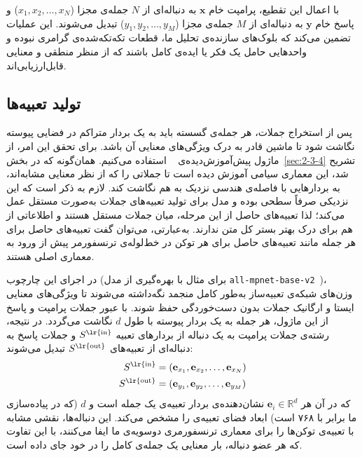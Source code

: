 با اعمال این تقطیع، پرامپت خام $\mathbf{x}$ به دنباله‌ای از $N$ جمله‌ی مجزا ($x_1, x_2, \dots, x_N$) و پاسخ خام $\mathbf{y}$ به دنباله‌ای از $M$ جمله‌ی مجزا ($y_1, y_2, \dots, y_M$) تبدیل می‌شوند. این عملیات تضمین می‌کند که بلوک‌های سازنده‌ی تحلیل ما، قطعات تکه‌تکه‌شده‌ی گرامری نبوده و واحدهایی حامل یک فکر یا ایده‌ی کامل باشند که از منظر منطقی و معنایی قابل‌ارزیابی‌اند.


\subsection{تولید تعبیه‌ها}\label{sec:4-2-2}

پس از استخراج جملات، هر جمله‌ی گسسته باید به یک بردار متراکم در فضایی پیوسته نگاشت شود تا ماشین قادر به درک ویژگی‌های معنایی آن باشد. برای تحقق این امر، از ماژول پیش‌آموزش‌دیده‌ی ~\cite{reimers2019sentencebert} استفاده می‌کنیم. همان‌گونه که در بخش~\ref{sec:2-3-4} تشریح شد، این معماری سیامی آموزش دیده است تا جملاتی را که از نظر معنایی مشابه‌اند، به بردارهایی با فاصله‌ی هندسی نزدیک به هم نگاشت کند. لازم به ذکر است که این نزدیکی صرفاً سطحی بوده و مدل برای تولید تعبیه‌های جملات به‌صورت مستقل عمل می‌کند؛ لذا تعبیه‌های حاصل از این مرحله، میان جملات مستقل هستند و اطلاعاتی از هم برای درک بهتر بستر کل متن ندارند. به‌عبارتی، می‌توان گفت تعبیه‌های حاصل برای هر جمله مانند تعبیه‌های حاصل برای هر توکن در خط‌لوله‌ی ترنسفورمر پیش از ورود به معماری اصلی هستند.

در اجرای این چارچوب (برای مثال با بهره‌گیری از مدل \texttt{all-mpnet-base-v2}~\cite{song2020mpnet})، وزن‌های شبکه‌ی تعبیه‌ساز به‌طور کامل منجمد نگه‌داشته می‌شوند تا ویژگی‌های معنایی ایستا و ارگانیک جملات بدون دست‌خوردگی حفظ شوند. با عبور جملات پرامپت و پاسخ از این ماژول، هر جمله به یک بردار پیوسته با طول $d$ نگاشت می‌گردد. در نتیجه، رشته‌ی جملات پرامپت به یک دنباله از بردارهای تعبیه $S^{\text{\lr{in}}}$ و جملات پاسخ به دنباله‌ای از تعبیه‌های $S^{\text{\lr{out}}}$ تبدیل می‌شوند:
\begin{align}
    S^{\text{\lr{in}}} &= (\mathbf{e}_{x_1}, \mathbf{e}_{x_2}, \dots, \mathbf{e}_{x_N}) \label{eq:chap4_embed_in} \\
    S^{\text{\lr{out}}} &= (\mathbf{e}_{y_1}, \mathbf{e}_{y_2}, \dots, \mathbf{e}_{y_M}) \label{eq:chap4_embed_out}
\end{align}
که در آن هر $\mathbf{e}_i \in \mathbb{R}^d$ نشان‌دهنده‌ی بردار تعبیه‌ی یک جمله است و $d$ (که در پیاده‌سازی ما برابر با ۷۶۸ است) ابعاد فضای تعبیه‌ی  را مشخص می‌کند. این دنباله‌ها، نقشی مشابه با تعبیه‌ی توکن‌ها را برای معماری ترنسفورمری دوسویه‌ی ما ایفا می‌کنند، با این تفاوت که هر عضو دنباله، بار معنایی یک جمله‌ی کامل را در خود جای داده است.


